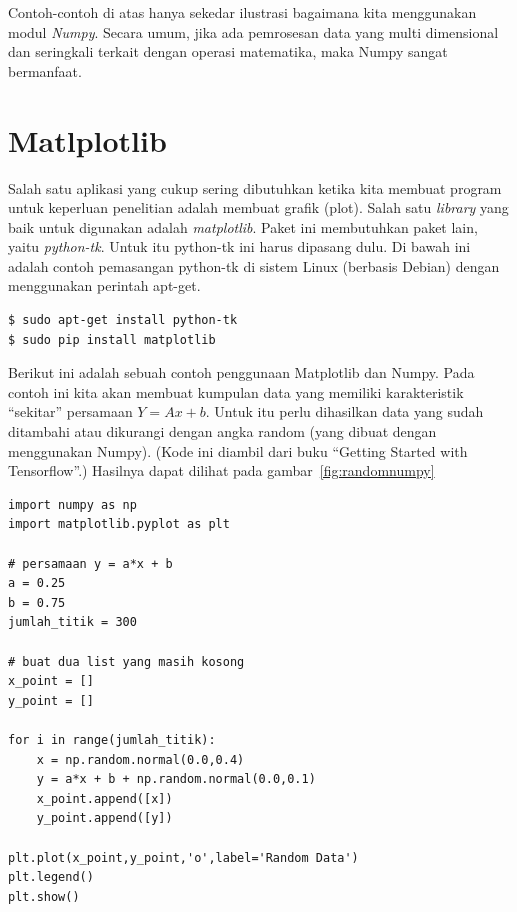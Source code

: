 Contoh-contoh di atas hanya sekedar ilustrasi bagaimana kita menggunakan
modul {\em Numpy}. Secara umum, jika ada pemrosesan data yang multi dimensional
dan seringkali terkait dengan operasi matematika, maka Numpy
sangat bermanfaat.

\section{Matlplotlib}
Salah satu aplikasi yang cukup sering dibutuhkan ketika kita membuat program 
untuk keperluan penelitian adalah membuat grafik (plot). 
Salah satu {\em library} yang baik untuk digunakan adalah {\em matplotlib}. 
Paket ini membutuhkan paket lain, yaitu {\em python-tk}. 
Untuk itu python-tk ini harus dipasang dulu. 
Di bawah ini adalah contoh pemasangan python-tk di sistem Linux (berbasis Debian) 
dengan menggunakan perintah apt-get.

\begin{verbatim}
$ sudo apt-get install python-tk
$ sudo pip install matplotlib
\end{verbatim}

Berikut ini adalah sebuah contoh penggunaan Matplotlib dan Numpy. Pada contoh ini kita akan membuat kumpulan data yang memiliki karakteristik ``sekitar'' persamaan 
$Y = Ax + b$.
Untuk itu perlu dihasilkan data yang sudah ditambahi atau dikurangi dengan angka random (yang dibuat dengan menggunakan Numpy). (Kode ini diambil dari buku ``Getting Started with Tensorflow''\cite{tensorflowstarted}.)
Hasilnya dapat dilihat pada gambar~\ref{fig:randomnumpy}


\begin{verbatim}
import numpy as np
import matplotlib.pyplot as plt

# persamaan y = a*x + b
a = 0.25
b = 0.75
jumlah_titik = 300

# buat dua list yang masih kosong
x_point = []
y_point = []

for i in range(jumlah_titik):
    x = np.random.normal(0.0,0.4)
    y = a*x + b + np.random.normal(0.0,0.1)
    x_point.append([x])
    y_point.append([y])

plt.plot(x_point,y_point,'o',label='Random Data')
plt.legend()
plt.show()
\end{verbatim}


